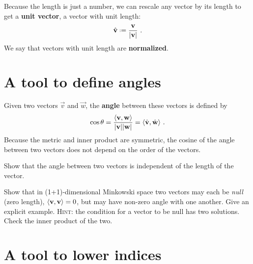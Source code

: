 \documentclass[12pt, oneside]{report}    %
\let\oldsection\section
\def\section{%
  \setcounter{sidenote}{1}%
  \oldsection
}
\begin{document}
Because the length is just a number, we can rescale any vector by its length to get a \textbf{unit vector}, a vector with unit length:
\begin{align}
    \hat{\vec{v}} \defeq \frac{\vec{v}}{|\vec{v}|} \ .
\end{align}
We say that vectors with unit length are \textbf{normalized}. 


\section{A tool to define angles}

Given two vectors $\vec{v}$ and $\vec{w}$, the \textbf{angle} between these vectors is defined by
\begin{align}
    \cos\theta = \frac{\langle \mathbf{v}, \mathbf{w} \rangle}{|\mathbf{v}| |\mathbf{w}|}
    =
    \langle \hat{\mathbf{v}}, \hat{\mathbf{w}} \rangle \ .
    \label{eq:cos:theta:angle:defined:metric}
\end{align}
Because the metric and inner product are symmetric, the cosine of the angle between two vectors does not depend on the order of the vectors.

\begin{exercise}
Show that the angle between two vectors is independent of the length of the vector. 
\end{exercise}

\begin{exercise}
Show that in (1+1)-dimensional Minkowski space two vectors may each be \emph{null} (zero length), $\langle \mathbf{v},\mathbf{v}\rangle =0$, but may have non-zero angle with one another. Give an explicit example.  \textsc{Hint}: the condition for a vector to be null has two solutions. Check the inner product of the two.
\end{exercise}


\section{A tool to lower indices}
\end{document}
